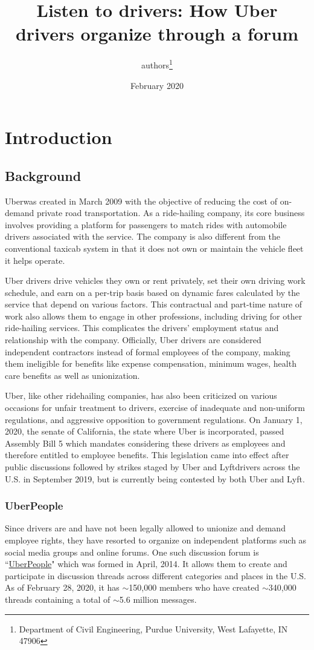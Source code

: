 \documentclass[10pt, twocolumn]{article}
\title{\textbf{Listen to drivers: How Uber drivers organize through a forum}}
\author{authors\footnote{Department of Civil Engineering, Purdue University, West Lafayette, IN 47906}}
\date{February 2020}
\begin{document}
\maketitle

\section{Introduction}

\subsection{Background}
Uber\texttrademark was created in March 2009 with the objective of reducing the cost of on-demand private road transportation. As a ride-hailing company, its core business involves providing a platform for passengers to match rides with automobile drivers associated with the service. The company is also different from the conventional taxicab system in that it does not own or maintain the vehicle fleet it helps operate. 

Uber drivers drive vehicles they own or rent privately, set their own driving work schedule, and earn on a per-trip basis based on dynamic fares calculated by the service that depend on various factors. This contractual and part-time nature of work also allows them to engage in other professions, including driving for other ride-hailing services. This complicates the drivers' employment status and relationship with the company. Officially, Uber drivers are considered independent contractors instead of formal employees of the company, making them ineligible for benefits like expense compensation, minimum wages, health care benefits as well as unionization.

Uber, like other ridehailing companies, has also been criticized on various occasions for unfair treatment to drivers, exercise of inadequate and non-uniform regulations, and aggressive opposition to government regulations. On January 1, 2020, the senate of California, the state where Uber is incorporated, passed Assembly Bill 5 which mandates considering these drivers as employees and therefore entitled to employee benefits. This legislation came into effect after public discussions followed by strikes staged by Uber and Lyft\texttrademark drivers across the U.S. in September 2019, but is currently being contested by both Uber and Lyft.

\subsubsection{UberPeople}
Since drivers are and have not been legally allowed to unionize and demand employee rights, they have resorted to organize on independent platforms such as social media groups and online forums. One such discussion forum is ``\href{https://uberpeople.net/}{UberPeople}" which was formed in April, 2014. It allows them to create and participate in discussion threads across different categories and places in the U.S. As of February 28, 2020, it has $\sim$150,000 members who have created $\sim$340,000 threads containing a total of $\sim$5.6 million messages.
\end{document}
